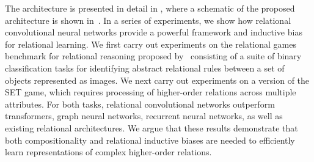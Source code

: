 The architecture is presented in detail in , where a schematic of the proposed architecture is shown in~. 
In a series of experiments, we show how relational convolutional neural networks provide a powerful framework and inductive bias for relational learning. We first carry out experiments on the relational games benchmark for relational reasoning proposed by~\citep{shanahanExplicitlyRelationalNeural} consisting of a suite of binary classification tasks for identifying abstract relational rules between a set of objects represented as images. We next carry out experiments on a version of the SET game, which requires processing of higher-order relations across multiple attributes. For both tasks, relational convolutional networks outperform transformers, graph neural networks, recurrent neural networks, as well as existing relational architectures. We argue that these results demonstrate that both compositionality and relational inductive biases are needed to efficiently learn representations of complex higher-order relations.

